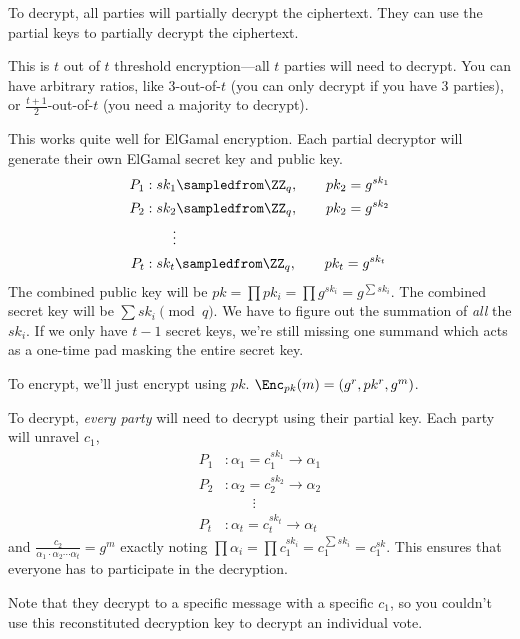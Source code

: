 To decrypt, all parties will partially decrypt the ciphertext. They can use the partial keys to partially decrypt the ciphertext.

This is $t$ out of $t$ threshold encryption---all $t$ parties will need to decrypt. You can have arbitrary ratios, like $3$-out-of-$t$ (you can only decrypt if you have $3$ parties), or $\frac{t+1}{2}$-out-of-$t$ (you need a majority to decrypt).

\begin{example}
    This works quite well for ElGamal encryption. Each partial decryptor will generate their own ElGamal secret key and public key.
    \begin{align*}
        P_1 & : sk_1\sampledfrom \ZZ_q,\qquad pk_2 = g^{sk_1} \\
        P_2 & : sk_2\sampledfrom \ZZ_q,\qquad pk_2 = g^{sk_2} \\
            & \qquad \vdots                                   \\
        P_t & : sk_t\sampledfrom \ZZ_q,\qquad pk_t = g^{sk_t}
    \end{align*}
    The combined public key will be $pk = \prod pk_i = \prod g^{sk_i} = g^{\sum sk_i}$. The combined secret key will be $\sum sk_i\pmod{q}$. We have to figure out the summation of \emph{all} the $sk_i$. If we only have $t-1$ secret keys, we're still missing one summand which acts as a one-time pad masking the entire secret key.

    To encrypt, we'll just encrypt using $pk$. $\Enc_{pk}(m) = (g^r, pk^r, g^m)$.

    To decrypt, \emph{every party} will need to decrypt using their partial key. Each party will unravel $c_1$,
    \begin{align*}
        P_1 & : \alpha_1 = c_1^{sk_1}\longrightarrow \alpha_1 \\
        P_2 & : \alpha_2 = c_2^{sk_2}\longrightarrow \alpha_2 \\
            & \qquad \vdots                                   \\
        P_t & : \alpha_t = c_t^{sk_t}\longrightarrow \alpha_t
    \end{align*}
    and $\frac{c_2}{\alpha_1\cdot \alpha_2\cdots \alpha_t} = g^m$ exactly noting $\prod \alpha_i = \prod c_1^{sk_i} = c_1^{\sum sk_i} = c_1^{sk}$. This ensures that everyone has to participate in the decryption.

    Note that they decrypt to a specific message with a specific $c_1$, so you couldn't use this reconstituted decryption key to decrypt an individual vote.
\end{example}

